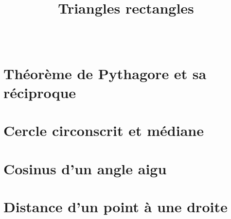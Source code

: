 \documentclass[paper=a4, fontsize=9pt]{scrartcl} %
\title{	
  \vspace{-10ex}
  \horrule{0.5pt} \\[0.4cm] %
  \huge Triangles rectangles\\ %
  \horrule{2pt} \\[0.5cm] %
}
\author{}
\date{\vspace{-10ex}} %
\begin{document}

\newtheorem{Definition}{Définition}
\newtheorem{Theorem}{Théorème}
\newtheorem{Proposition}{Propriété}

\renewcommand{\labelitemi}{$\bullet$}
\renewcommand{\labelitemii}{$\circ$}

\maketitle %

\section{Théorème de Pythagore et sa réciproque}
\section{Cercle circonscrit et médiane}
\section{Cosinus d'un angle aigu}
\section{Distance d'un point à une droite}
\end{document}
